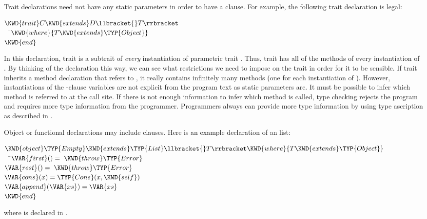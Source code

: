 Trait declarations need not have any static parameters in order
to have a  clause. For example, the following trait
declaration is legal:
\begin{Fortress}
\(\KWD{trait} C \KWD{extends} D\llbracket{}T\rrbracket\)\\
{\tt~~}\pushtabs\=\+\(  \KWD{where} \{T \KWD{extends} \TYP{Object}\}\)\-\\\poptabs
\(\KWD{end}\)
\end{Fortress}
In this declaration, trait  is a subtrait of \emph{every}
instantiation of parametric trait . Thus, trait  has all
of the methods of every instantiation of . By thinking of the
declaration this way, we can see what restrictions we need to impose on
the trait  in order for it to be sensible. If trait
 inherits a method declaration that refers to , it really
contains infinitely many methods (one for each instantiation of ).
However, instantiations of the -clause variables are not
explicit from the program text as static parameters are.
It must be possible to infer which method is referred to at the call site.
If there is not enough information to infer which method is called,
type checking rejects the
program and requires more type information from the programmer.
Programmers always can provide more type information by using type
ascription as described in .


Object or functional declarations may include  clauses.
Here is an example declaration of an  list:
\begin{Fortress}
\(\KWD{object} \TYP{Empty} \KWD{extends} \TYP{List}\llbracket{}T\rrbracket \KWD{where} \{T \KWD{extends} \TYP{Object}\}\)\\
{\tt~~}\pushtabs\=\+\(  \VAR{first}() = \;\KWD{throw} \TYP{Error}\)\\
\(  \VAR{rest}() = \;\KWD{throw} \TYP{Error}\)\\
\(  \VAR{cons}(x) = \TYP{Cons}(x,\KWD{self})\)\\
\(  \VAR{append}(\VAR{xs}) = \VAR{xs}\)\-\\\poptabs
\(\KWD{end}\)
\end{Fortress}
where  is declared in .
